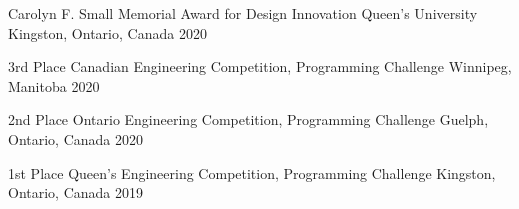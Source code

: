 



\begin{cvhonors}


  \cvhonor
    {Carolyn F. Small Memorial Award for Design Innovation} %
    {Queen's University} %
    {Kingston, Ontario, Canada} %
    {2020} %

  \cvhonor
    {3rd Place} %
    {Canadian Engineering Competition, Programming Challenge} %
    {Winnipeg, Manitoba} %
    {2020} %

  \cvhonor
    {2nd Place} %
    {Ontario Engineering Competition, Programming Challenge} %
    {Guelph, Ontario, Canada} %
    {2020} %

  \cvhonor
    {1st Place} %
    {Queen's Engineering Competition, Programming Challenge} %
    {Kingston, Ontario, Canada} %
    {2019} %
    
\end{cvhonors}